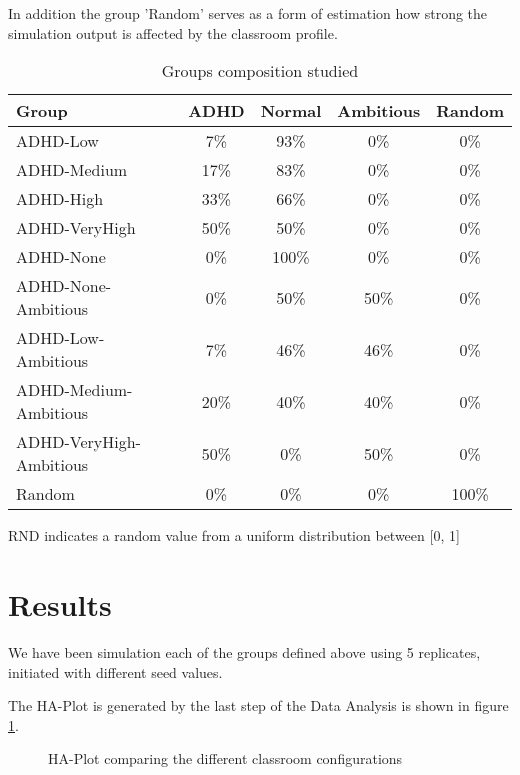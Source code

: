 In addition the group 'Random' serves as a form of estimation how strong the simulation
output is affected by the classroom profile.

\begin{table}[h!]
    \centering
    \begin{tabular}{|l|c|c|c|c|} 
        \hline
        \textbf{Group} & \textbf{ADHD} & \textbf{Normal} & \textbf{Ambitious} &  \textbf{Random} \\
        \hline
        \hline
        ADHD-Low & 7\% & 93\% & 0\% & 0\% \\
        \hline
        ADHD-Medium & 17\% & 83\% & 0\% & 0\% \\
        \hline
        ADHD-High & 33\% & 66\% & 0\% & 0\% \\
        \hline
        ADHD-VeryHigh & 50\% & 50\% & 0\% & 0\% \\
        \hline
        ADHD-None & 0\% & 100\% & 0\% & 0\% \\
        \hline
        ADHD-None-Ambitious & 0\% & 50\% & 50\% & 0\% \\
        \hline
        ADHD-Low-Ambitious & 7\% & 46\% & 46\% & 0\% \\
        \hline
        ADHD-Medium-Ambitious & 20\% & 40\% & 40\% & 0\%\\
        \hline
        ADHD-VeryHigh-Ambitious & 50\% & 0\% & 50\% & 0\%\\
        \hline
        Random & 0\% & 0\% & 0\% & 100\% \\
        \hline
    \end{tabular}
    \caption{Groups composition studied}
    \small RND indicates a random value from a uniform distribution between [0, 1]
    \label{GroupTable}
\end{table}

\section{Results}
We have been simulation each of the groups defined above using 5 replicates, initiated
with different seed values.

The HA-Plot is generated by the last step of the Data Analysis is shown in figure \ref{StudyResults}.

\begin{figure}[H]
    \caption{HA-Plot comparing the different classroom configurations}
    \label{StudyResults}
\end{figure}

